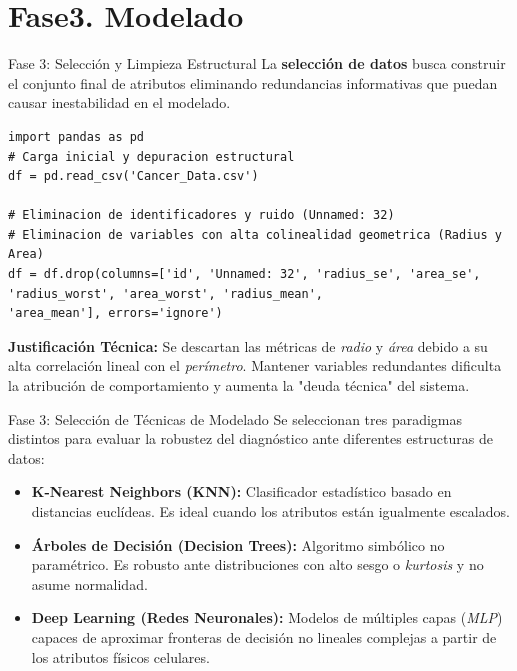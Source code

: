 \documentclass{beamer}
\begin{document}
	\section{Fase3. Modelado}
	\begin{frame}[fragile]{Fase 3: Selección y Limpieza Estructural}
		La \textbf{selección de datos} busca construir el conjunto final de atributos eliminando redundancias informativas que puedan causar inestabilidad en el modelado.
		
		\begin{lstlisting}[style=colab]
import pandas as pd
# Carga inicial y depuracion estructural
df = pd.read_csv('Cancer_Data.csv')

# Eliminacion de identificadores y ruido (Unnamed: 32)
# Eliminacion de variables con alta colinealidad geometrica (Radius y Area)
df = df.drop(columns=['id', 'Unnamed: 32', 'radius_se', 'area_se', 
'radius_worst', 'area_worst', 'radius_mean', 
'area_mean'], errors='ignore')
		\end{lstlisting}
		
		\textbf{Justificación Técnica:} Se descartan las métricas de \textit{radio} y \textit{área} debido a su alta correlación lineal con el \textit{perímetro}. Mantener variables redundantes dificulta la atribución de comportamiento y aumenta la "deuda técnica" del sistema.
	\end{frame}
	
	\begin{frame}{Fase 3: Selección de Técnicas de Modelado}
		Se seleccionan tres paradigmas distintos para evaluar la robustez del diagnóstico ante diferentes estructuras de datos:
		
		\begin{itemize}
			\item<2-> \textbf{K-Nearest Neighbors (KNN):} Clasificador estadístico basado en distancias euclídeas. Es ideal cuando los atributos están igualmente escalados.
			\item<3-> \textbf{Árboles de Decisión (Decision Trees):} Algoritmo simbólico no paramétrico. Es robusto ante distribuciones con alto sesgo o \textit{kurtosis} y no asume normalidad.
			\item<4-> \textbf{Deep Learning (Redes Neuronales):} Modelos de múltiples capas (\textit{MLP}) capaces de aproximar fronteras de decisión no lineales complejas a partir de los atributos físicos celulares.
		\end{itemize}
	\end{frame}
	
\end{document}
